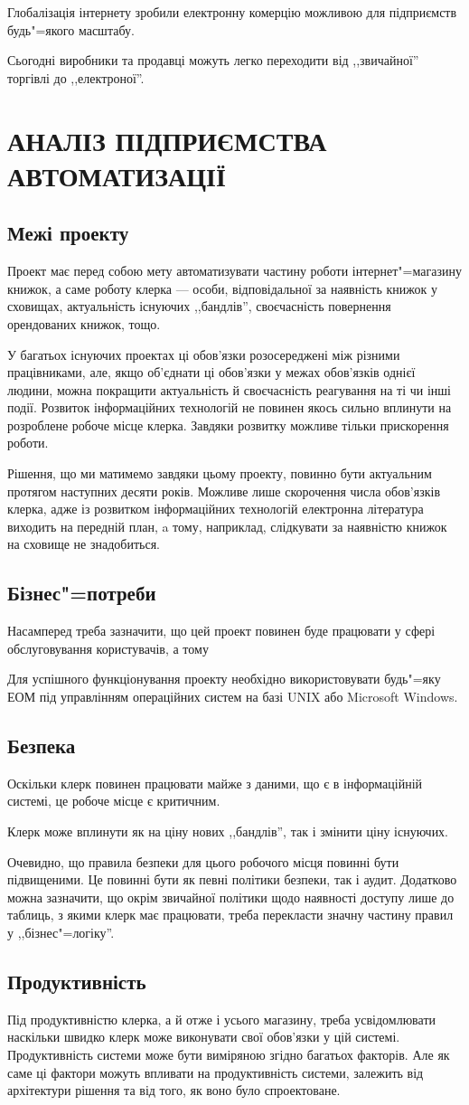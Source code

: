 \documentclass[a4paper,notitlepage,headsepline,pdftex,oneside]{report}
\newcommand{\setfontsize}[1]{\fontsize{#1pt}{#1pt}\selectfont}
\newcommand{\Chapter}[1]{\chapter{#1} \renewcommand{\baselinestretch}{1.5}\setfontsize{14pt}}
\newcommand{\Section}[1]{\section{#1} \renewcommand{\baselinestretch}{1.5}\setfontsize{14pt}}
\begin{document}
  Глобалізація інтернету зробили електронну комерцію можливою для підприємств
  будь"=якого масштабу.

  Сьогодні виробники та продавці можуть легко переходити від ,,звичайної''
  торгівлі до ,,електроної''.
\Chapter{АНАЛІЗ ПІДПРИЄМСТВА АВТОМАТИЗАЦІЇ}
  \Section{Межі проекту}
    Проект має перед собою мету автоматизувати частину роботи
    інтернет"=магазину книжок, а саме роботу клерка --- особи, відповідальної
    за наявність книжок у сховищах, актуальність існуючих ,,бандлів'',
    своєчасність повернення орендованих книжок, тощо.

    У багатьох існуючих проектах ці обов’язки розосереджені між різними
    працівниками, але, якщо об’єднати ці обов’язки у межах обов’язків однієї
    людини, можна покращити актуальність й своєчасність реагування на ті чи
    інші події.
    Розвиток інформаційних технологій не повинен якось сильно вплинути на
    розроблене робоче місце клерка.
    Завдяки розвитку можливе тільки прискорення роботи.

    Рішення, що ми матимемо завдяки цьому проекту, повинно бути актуальним
    протягом наступних десяти років.
    Можливе лише скорочення числа обов’язків клерка, адже із розвитком
    інформаційних технологій електронна література виходить на передній план,
    a тому, наприклад, слідкувати за наявністю книжок на сховище не
    знадобиться.
  \Section{Бізнес"=потреби}
    Насамперед треба зазначити, що цей проект повинен буде працювати у сфері
    обслуговування користувачів, а тому

    Для успішного функціонування проекту необхідно використовувати будь"=яку
    ЕОМ під управлінням операційних систем на базі UNIX або
    Microsoft Windows.

  \Section{Безпека}
    Оскільки клерк повинен працювати майже з даними, що є в інформаційній
    системі, це робоче місце є критичним.

    Клерк може вплинути як на ціну нових ,,бандлів'', так і змінити ціну
    існуючих.

    Очевидно, що правила безпеки для цього робочого місця повинні бути
    підвищеними.
    Це повинні бути як певні політики безпеки, так і аудит.
    Додатково можна зазначити, що окрім звичайної політики щодо наявності
    доступу лише до таблиць, з якими клерк має працювати, треба перекласти
    значну частину правил у ,,бізнес"=логіку''.
  \Section{Продуктивність}
    Під продуктивністю клерка, а й отже і усього магазину, треба
    усвідомлювати наскільки швидко клерк може виконувати свої обов’язки у цій
    системі.
    Продуктивність системи може бути виміряною згідно багатьох факторів.
    Але як саме ці фактори можуть впливати на продуктивність системи, залежить
    від архітектури рішення та від того, як воно було спроектоване.
\end{document}
